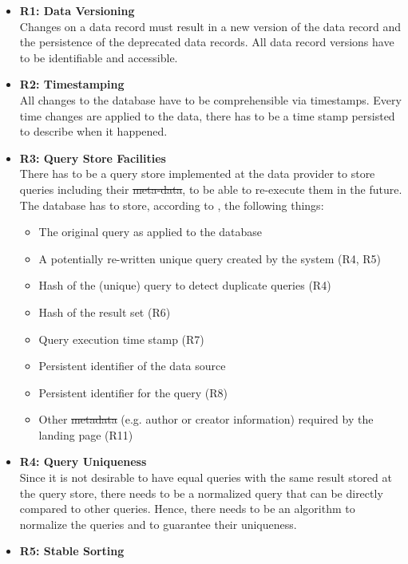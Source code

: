 \documentclass[draft,final]{vutinfth} %
\providecommand{\DIFaddtex}[1]{{\protect\color{blue}\uwave{#1}}} %
\providecommand{\DIFdeltex}[1]{{\protect\color{red}\sout{#1}}}                      %
\providecommand{\DIFaddbegin}{} %
\providecommand{\DIFaddend}{} %
\providecommand{\DIFdelbegin}{} %
\providecommand{\DIFdelend}{} %
\providecommand{\DIFadd}[1]{\texorpdfstring{\DIFaddtex{#1}}{#1}} %
\providecommand{\DIFdel}[1]{\texorpdfstring{\DIFdeltex{#1}}{}} %
\begin{document}
\begin{itemize}
	\item \textbf{R1: Data Versioning} \\
	Changes on a data record must result in a new version of the data record and the persistence of the deprecated data records. All data record versions have to be identifiable and accessible. 
	\item \textbf{R2: Timestamping} \\
	All changes to the database have to be comprehensible via timestamps. Every time changes are applied to the data, there has to be a time stamp persisted to describe when it happened. 
	\item \textbf{R3: Query Store Facilities} \\
	There has to be a query store implemented at the data provider to store queries including their \DIFdelbegin \DIFdel{meta-data}\DIFdelend \DIFaddbegin \DIFadd{data}\DIFaddend , to be able to re-execute them in the future. The database has to store, according to \cite{rauber2016identification}, the following things: 
	\begin{itemize}
		\item The original query as applied to the database
		\item A potentially re-written unique query created by the system (R4, R5)
		\item Hash of the (unique) query to detect duplicate queries (R4)
		\item Hash of the result set (R6)
		\item Query execution time stamp (R7)
		\item Persistent identifier of the data source
		\item Persistent identifier for the query (R8)
		\item Other \DIFdelbegin \DIFdel{metadata }\DIFdelend \DIFaddbegin \DIFadd{data }\DIFaddend (e.g. author or creator information) required by the landing page (R11)
	\end{itemize}
	\item \textbf{R4: Query Uniqueness} \\
	Since it is not desirable to have equal queries with the same result stored at the query store, there needs to be a normalized query that can be directly compared to other queries. Hence, there needs to be an algorithm to normalize the queries and to guarantee their uniqueness.
	\item \textbf{R5: Stable Sorting} \\

\end{itemize}
\end{document}
